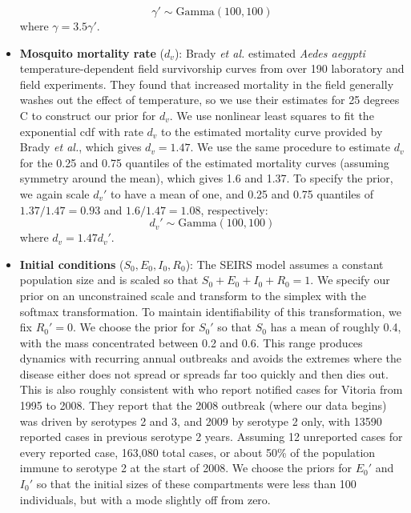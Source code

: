 \documentclass[10pt,letterpaper]{article}
\begin{document}
\begin{itemize}
\begin{equation}
\gamma' \sim \text{Gamma}(100, 100)
\end{equation}
where $\gamma = 3.5\gamma'$.
\\
\item \textbf{Mosquito mortality rate} ($d_v$): Brady \textit{et al.} \cite{Brady2013} estimated \textit{Aedes aegypti} temperature-dependent field survivorship curves from over 190 laboratory and field experiments.
They found that increased mortality in the field generally washes out the effect of temperature, so we use their estimates for 25 degrees C to construct our prior for $d_v$.  
We use nonlinear least squares to fit the exponential cdf with rate $d_v$ to the estimated mortality curve provided by Brady \textit{et al.}, which gives $d_v = 1.47$.
We use the same procedure to estimate $d_v$ for the 0.25 and 0.75 quantiles of the estimated mortality curves (assuming symmetry around the mean), which gives 1.6 and 1.37.
To specify the prior, we again scale $d_v'$ to have a mean of one, and 0.25 and 0.75 quantiles of $1.37 / 1.47 = 0.93$ and $1.6 / 1.47 = 1.08$, respectively:
\begin{equation}
d_v' \sim \text{Gamma}(100, 100)
\end{equation}
where $d_v = 1.47d_v'$.
\\
\item \textbf{Initial conditions} ($S_0, E_0, I_0, R_0$): The SEIRS model assumes a constant population size and is scaled so that $S_0+E_0+I_0+R_0 = 1$.
We specify our prior on an unconstrained scale and transform to the simplex with the softmax transformation.
To maintain identifiability of this transformation, we fix $R_0' = 0$.
We choose the prior for $S_0'$  so that $S_0$ has a mean of roughly  0.4, with the mass concentrated between 0.2 and 0.6.
This range produces dynamics with recurring annual outbreaks and avoids the extremes where the disease either does not spread or spreads far too quickly and then dies out.
This is also roughly consistent with \cite{Cardoso2011a} who report notified cases for Vitoria from 1995 to 2008. 
They report that the 2008 outbreak (where our data begins) was driven by serotypes 2 and 3, and 2009 by serotype 2 only, with 13590 reported cases in previous serotype 2 years.
Assuming 12 unreported cases for every reported case, 163,080 total cases, or about 50\% of the population immune to serotype 2 at the start of 2008.
We choose the priors for $E_0'$ and $I_0'$ so that the initial sizes of these compartments were less than 100 individuals, but with a mode slightly off from zero.

\end{itemize}
\end{document}
